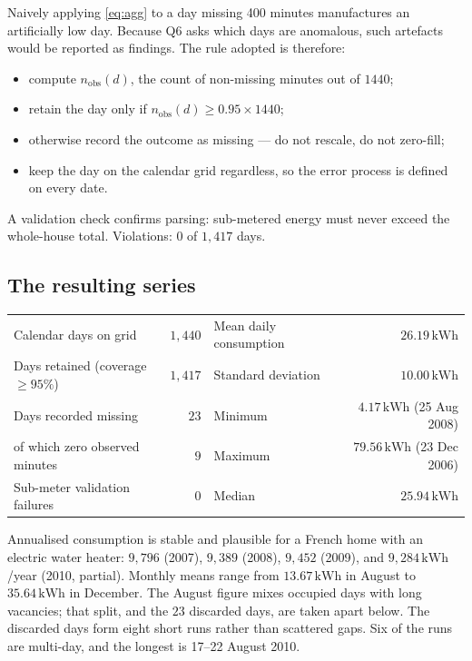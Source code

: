 \documentclass[11pt]{article}
\newcommand{\kwh}{\,\mathrm{kWh}}
\begin{document}
Naively applying \eqref{eq:agg} to a day missing 400 minutes manufactures an
artificially low day. Because Q6 asks which days are anomalous, such artefacts
would be reported as findings. The rule adopted is therefore:

\begin{itemize}
\item compute $n_{\text{obs}}(d)$, the count of non-missing minutes out of $1440$;
\item retain the day only if $n_{\text{obs}}(d) \ge 0.95 \times 1440$;
\item otherwise record the outcome as missing --- do not rescale, do not zero-fill;
\item keep the day on the calendar grid regardless, so the error process is
defined on every date.
\end{itemize}

A validation check confirms parsing: sub-metered energy must never exceed the
whole-house total. Violations: $0$ of $1{,}417$ days.

\subsection{The resulting series}

\begin{center}
\small
\begin{tabular}{@{}lr@{\qquad}lr@{}}
\toprule
Calendar days on grid & $1{,}440$ & Mean daily consumption & $26.19\kwh$ \\
Days retained (coverage $\ge 95\%$) & $1{,}417$ & Standard deviation & $10.00\kwh$ \\
Days recorded missing & $23$ & Minimum & $4.17\kwh$ (25 Aug 2008) \\
\quad of which zero observed minutes & $9$ & Maximum & $79.56\kwh$ (23 Dec 2006) \\
Sub-meter validation failures & $0$ & Median & $25.94\kwh$ \\
\bottomrule
\end{tabular}
\end{center}

Annualised consumption is stable and plausible for a French home with an
electric water heater: $9{,}796$ (2007), $9{,}389$ (2008), $9{,}452$ (2009),
and $9{,}284\kwh$/year (2010, partial). Monthly means range from $13.67\kwh$
in August to $35.64\kwh$ in December. The August figure mixes occupied days
with long vacancies; that split, and the $23$ discarded days, are taken apart
below. The discarded days form eight short runs rather than scattered gaps.
Six of the runs are multi-day, and the longest is 17--22 August 2010.
\end{document}
